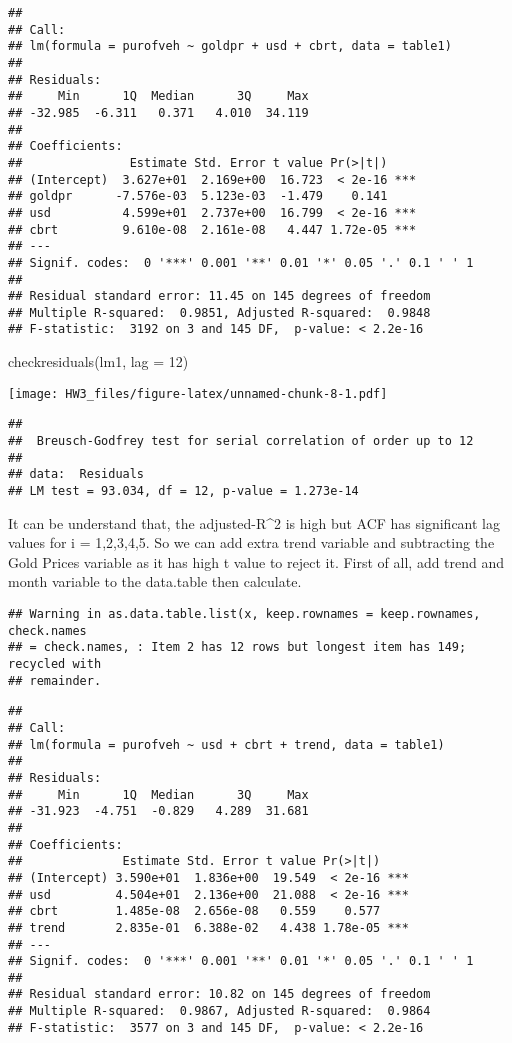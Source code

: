 \documentclass[
]{article}
\newenvironment{Shaded}{\begin{snugshade}}{\end{snugshade}}
\newcommand{\AttributeTok}[1]{\textcolor[rgb]{0.77,0.63,0.00}{#1}}
\newcommand{\DecValTok}[1]{\textcolor[rgb]{0.00,0.00,0.81}{#1}}
\newcommand{\FunctionTok}[1]{\textcolor[rgb]{0.00,0.00,0.00}{#1}}
\newcommand{\NormalTok}[1]{#1}
\begin{document}
\begin{verbatim}
## 
## Call:
## lm(formula = purofveh ~ goldpr + usd + cbrt, data = table1)
## 
## Residuals:
##     Min      1Q  Median      3Q     Max 
## -32.985  -6.311   0.371   4.010  34.119 
## 
## Coefficients:
##               Estimate Std. Error t value Pr(>|t|)    
## (Intercept)  3.627e+01  2.169e+00  16.723  < 2e-16 ***
## goldpr      -7.576e-03  5.123e-03  -1.479    0.141    
## usd          4.599e+01  2.737e+00  16.799  < 2e-16 ***
## cbrt         9.610e-08  2.161e-08   4.447 1.72e-05 ***
## ---
## Signif. codes:  0 '***' 0.001 '**' 0.01 '*' 0.05 '.' 0.1 ' ' 1
## 
## Residual standard error: 11.45 on 145 degrees of freedom
## Multiple R-squared:  0.9851, Adjusted R-squared:  0.9848 
## F-statistic:  3192 on 3 and 145 DF,  p-value: < 2.2e-16
\end{verbatim}

\begin{Shaded}
\begin{Highlighting}[]
\FunctionTok{checkresiduals}\NormalTok{(lm1, }\AttributeTok{lag =} \DecValTok{12}\NormalTok{)}
\end{Highlighting}
\end{Shaded}

\texttt{[image: HW3\_files/figure-latex/unnamed-chunk-8-1.pdf]}

\begin{verbatim}
## 
##  Breusch-Godfrey test for serial correlation of order up to 12
## 
## data:  Residuals
## LM test = 93.034, df = 12, p-value = 1.273e-14
\end{verbatim}

It can be understand that, the adjusted-R\^{}2 is high but ACF has
significant lag values for i = 1,2,3,4,5. So we can add extra trend
variable and subtracting the Gold Prices variable as it has high t value
to reject it. First of all, add trend and month variable to the
data.table then calculate.

\begin{verbatim}
## Warning in as.data.table.list(x, keep.rownames = keep.rownames, check.names
## = check.names, : Item 2 has 12 rows but longest item has 149; recycled with
## remainder.
\end{verbatim}

\begin{verbatim}
## 
## Call:
## lm(formula = purofveh ~ usd + cbrt + trend, data = table1)
## 
## Residuals:
##     Min      1Q  Median      3Q     Max 
## -31.923  -4.751  -0.829   4.289  31.681 
## 
## Coefficients:
##              Estimate Std. Error t value Pr(>|t|)    
## (Intercept) 3.590e+01  1.836e+00  19.549  < 2e-16 ***
## usd         4.504e+01  2.136e+00  21.088  < 2e-16 ***
## cbrt        1.485e-08  2.656e-08   0.559    0.577    
## trend       2.835e-01  6.388e-02   4.438 1.78e-05 ***
## ---
## Signif. codes:  0 '***' 0.001 '**' 0.01 '*' 0.05 '.' 0.1 ' ' 1
## 
## Residual standard error: 10.82 on 145 degrees of freedom
## Multiple R-squared:  0.9867, Adjusted R-squared:  0.9864 
## F-statistic:  3577 on 3 and 145 DF,  p-value: < 2.2e-16
\end{verbatim}
\end{document}
